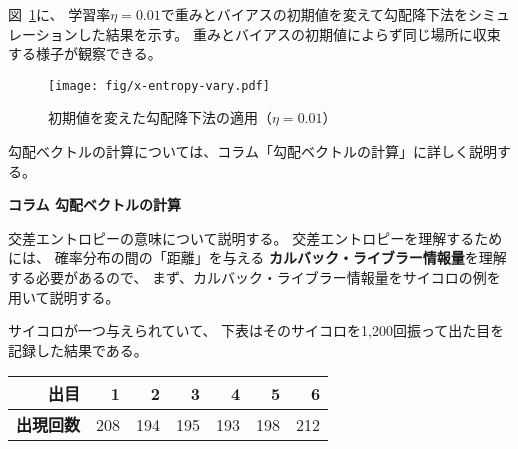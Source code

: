 図~\ref{fig:x-entropy-vary}に、
学習率$\eta = 0.01$で重みとバイアスの初期値を変えて勾配降下法をシミュレーションした結果を示す。
重みとバイアスの初期値によらず同じ場所に収束する様子が観察できる。

\begin{figure}
  \centering
  \texttt{[image: fig/x-entropy-vary.pdf]}
 
  \caption{初期値を変えた勾配降下法の適用（$\eta = 0.01$）}
  \label{fig:x-entropy-vary}
\end{figure}

勾配ベクトルの計算については、コラム「勾配ベクトルの計算」に詳しく説明する。

\begin{itembox}{\bf コラム 勾配ベクトルの計算}
  
\end{itembox}

交差エントロピーの意味について説明する。
交差エントロピーを理解するためには、
確率分布の間の「距離」を与える
\textbf{カルバック・ライブラー情報量}を理解する必要があるので、
まず、カルバック・ライブラー情報量をサイコロの例を用いて説明する。

サイコロが一つ与えられていて、
下表はそのサイコロを1,200回振って出た目を記録した結果である。

\begin{center}
  \begin{tabular}{r|rrrrrr}
    \toprule
\bf 出目 & \bf 1 & \bf 2 & \bf 3 & \bf 4 & \bf 5 & \bf 6 \\
    \midrule
\bf 出現回数 & 208 & 194 & 195 & 193 & 198 & 212 \\
    \bottomrule
  \end{tabular}
\end{center}

